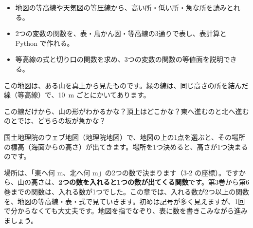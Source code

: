 \begin{goal}
\begin{itemize}[label={\color{\bkTT}●}, leftmargin=1.6\zw, itemsep=0pt, topsep=1pt]
\item {}\enspace 地図の等高線や天気図の等圧線から、高い所・低い所・急な所を読みとれる。
\item {}\enspace 2つの変数の関数を、表・鳥かん図・等高線の3通りで表し、表計算と Python で作れる。
\item {}\enspace 等高線の式と切り口の関数を求め、3つの変数の関数の等値面を説明できる。
\end{itemize}
\end{goal}

\begin{hatena}
\noindent\begin{minipage}[c]{0.5\linewidth}
\raggedright
この地図は、ある山を真上から見たものです。緑の線は、同じ高さの所を結んだ線（等高線）で、\qty{10}{m} ごとにかいてあります。\par\vspace{4pt}
この線だけから、山の形がわかるかな？\enspace 頂上はどこかな？\enspace 東へ進むのと北へ進むのとでは、どちらの坂が急かな？
\end{minipage}\hfill
\begin{minipage}[c]{0.47\linewidth}\centering
{}
\end{minipage}
\end{hatena}

\noindent 国土地理院のウェブ地図（地理院地図）で、地図の上の1点を選ぶと、その場所の標高（海面からの高さ）が出てきます。場所を1つ決めると、高さが1つ決まるのです。

場所は、「東へ何 m、北へ何 m」の2つの数で決まります（3-2 の座標）。ですから、山の高さは、\textbf{2つの数を入れると1つの数が出てくる関数}です。第3巻から第6巻までの関数は、入れる数が1つでした。この章では、入れる数が2つ以上の関数を、地図の等高線・表・式で見ていきます。初めは記号が多く見えますが、1回で分からなくても大丈夫です。地図を指でなぞり、表に数を書きこみながら進みましょう。

